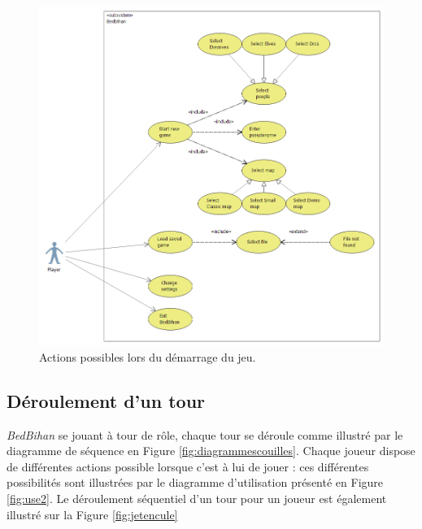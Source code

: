 		\begin{figure}
			\begin{center}
				\includegraphics[width=1\textwidth]{figure/cas_utilisation_launch.png}
			\end{center}
			\caption{Actions possibles lors du démarrage du jeu.}
			\label{fig:use1}
		\end{figure}


	\subsection{Déroulement d'un tour}

		\emph{BedBihan} se jouant à tour de rôle, chaque tour se déroule comme illustré par le diagramme de séquence en {\sc Figure} \ref{fig:diagrammescouilles}. Chaque joueur dispose de différentes actions possible lorsque c'est à lui de jouer : ces différentes possibilités sont illustrées par le diagramme d'utilisation présenté en {\sc Figure} \ref{fig:use2}. Le déroulement séquentiel d'un tour pour un joueur est également illustré sur la {\sc Figure} \ref{fig:jetencule}
		
